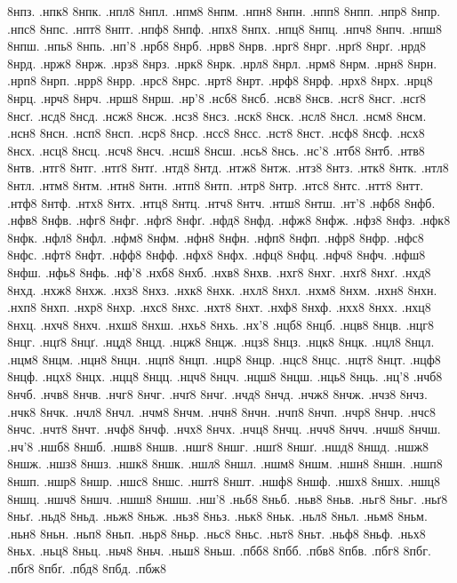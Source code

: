 {8нпз.
.нпк8
8нпк.
.нпл8
8нпл.
.нпм8
8нпм.
.нпн8
8нпн.
.нпп8
8нпп.
.нпр8
8нпр.
.нпс8
8нпс.
.нпт8
8нпт.
.нпф8
8нпф.
.нпх8
8нпх.
.нпц8
8нпц.
.нпч8
8нпч.
.нпш8
8нпш.
.нпь8
8нпь.
.нп'8
.нрб8
8нрб.
.нрв8
8нрв.
.нрг8
8нрг.
.нрґ8
8нрґ.
.нрд8
8нрд.
.нрж8
8нрж.
.нрз8
8нрз.
.нрк8
8нрк.
.нрл8
8нрл.
.нрм8
8нрм.
.нрн8
8нрн.
.нрп8
8нрп.
.нрр8
8нрр.
.нрс8
8нрс.
.нрт8
8нрт.
.нрф8
8нрф.
.нрх8
8нрх.
.нрц8
8нрц.
.нрч8
8нрч.
.нрш8
8нрш.
.нр'8
.нсб8
8нсб.
.нсв8
8нсв.
.нсг8
8нсг.
.нсґ8
8нсґ.
.нсд8
8нсд.
.нсж8
8нсж.
.нсз8
8нсз.
.нск8
8нск.
.нсл8
8нсл.
.нсм8
8нсм.
.нсн8
8нсн.
.нсп8
8нсп.
.нср8
8нср.
.нсс8
8нсс.
.нст8
8нст.
.нсф8
8нсф.
.нсх8
8нсх.
.нсц8
8нсц.
.нсч8
8нсч.
.нсш8
8нсш.
.нсь8
8нсь.
.нс'8
.нтб8
8нтб.
.нтв8
8нтв.
.нтг8
8нтг.
.нтґ8
8нтґ.
.нтд8
8нтд.
.нтж8
8нтж.
.нтз8
8нтз.
.нтк8
8нтк.
.нтл8
8нтл.
.нтм8
8нтм.
.нтн8
8нтн.
.нтп8
8нтп.
.нтр8
8нтр.
.нтс8
8нтс.
.нтт8
8нтт.
.нтф8
8нтф.
.нтх8
8нтх.
.нтц8
8нтц.
.нтч8
8нтч.
.нтш8
8нтш.
.нт'8
.нфб8
8нфб.
.нфв8
8нфв.
.нфг8
8нфг.
.нфґ8
8нфґ.
.нфд8
8нфд.
.нфж8
8нфж.
.нфз8
8нфз.
.нфк8
8нфк.
.нфл8
8нфл.
.нфм8
8нфм.
.нфн8
8нфн.
.нфп8
8нфп.
.нфр8
8нфр.
.нфс8
8нфс.
.нфт8
8нфт.
.нфф8
8нфф.
.нфх8
8нфх.
.нфц8
8нфц.
.нфч8
8нфч.
.нфш8
8нфш.
.нфь8
8нфь.
.нф'8
.нхб8
8нхб.
.нхв8
8нхв.
.нхг8
8нхг.
.нхґ8
8нхґ.
.нхд8
8нхд.
.нхж8
8нхж.
.нхз8
8нхз.
.нхк8
8нхк.
.нхл8
8нхл.
.нхм8
8нхм.
.нхн8
8нхн.
.нхп8
8нхп.
.нхр8
8нхр.
.нхс8
8нхс.
.нхт8
8нхт.
.нхф8
8нхф.
.нхх8
8нхх.
.нхц8
8нхц.
.нхч8
8нхч.
.нхш8
8нхш.
.нхь8
8нхь.
.нх'8
.нцб8
8нцб.
.нцв8
8нцв.
.нцг8
8нцг.
.нцґ8
8нцґ.
.нцд8
8нцд.
.нцж8
8нцж.
.нцз8
8нцз.
.нцк8
8нцк.
.нцл8
8нцл.
.нцм8
8нцм.
.нцн8
8нцн.
.нцп8
8нцп.
.нцр8
8нцр.
.нцс8
8нцс.
.нцт8
8нцт.
.нцф8
8нцф.
.нцх8
8нцх.
.нцц8
8нцц.
.нцч8
8нцч.
.нцш8
8нцш.
.нць8
8нць.
.нц'8
.нчб8
8нчб.
.нчв8
8нчв.
.нчг8
8нчг.
.нчґ8
8нчґ.
.нчд8
8нчд.
.нчж8
8нчж.
.нчз8
8нчз.
.нчк8
8нчк.
.нчл8
8нчл.
.нчм8
8нчм.
.нчн8
8нчн.
.нчп8
8нчп.
.нчр8
8нчр.
.нчс8
8нчс.
.нчт8
8нчт.
.нчф8
8нчф.
.нчх8
8нчх.
.нчц8
8нчц.
.нчч8
8нчч.
.нчш8
8нчш.
.нч'8
.ншб8
8ншб.
.ншв8
8ншв.
.ншг8
8ншг.
.ншґ8
8ншґ.
.ншд8
8ншд.
.ншж8
8ншж.
.ншз8
8ншз.
.ншк8
8ншк.
.ншл8
8ншл.
.ншм8
8ншм.
.ншн8
8ншн.
.ншп8
8ншп.
.ншр8
8ншр.
.ншс8
8ншс.
.ншт8
8ншт.
.ншф8
8ншф.
.ншх8
8ншх.
.ншц8
8ншц.
.ншч8
8ншч.
.ншш8
8ншш.
.нш'8
.ньб8
8ньб.
.ньв8
8ньв.
.ньг8
8ньг.
.ньґ8
8ньґ.
.ньд8
8ньд.
.ньж8
8ньж.
.ньз8
8ньз.
.ньк8
8ньк.
.ньл8
8ньл.
.ньм8
8ньм.
.ньн8
8ньн.
.ньп8
8ньп.
.ньр8
8ньр.
.ньс8
8ньс.
.ньт8
8ньт.
.ньф8
8ньф.
.ньх8
8ньх.
.ньц8
8ньц.
.ньч8
8ньч.
.ньш8
8ньш.
.пбб8
8пбб.
.пбв8
8пбв.
.пбг8
8пбг.
.пбґ8
8пбґ.
.пбд8
8пбд.
.пбж8
}
